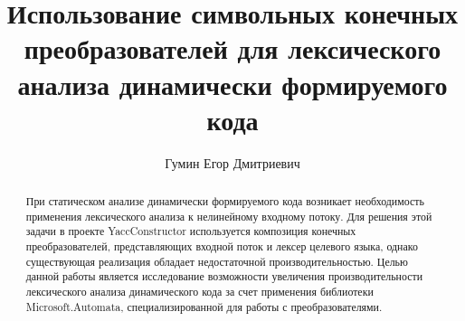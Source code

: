 \title{Использование символьных конечных преобразователей для лексического анализа динамически формируемого кода}


\author{Гумин Егор Дмитриевич}



\maketitle             

\begin{abstract}
При статическом анализе динамически формируемого кода возникает необходимость применения лексического анализа к нелинейному входному потоку.
Для решения этой задачи в проекте YaccConstructor используется композиция конечных преобразователей, 
представляющих входной поток и лексер целевого языка, 
однако существующая реализация обладает недостаточной производительностью. 
Целью данной работы является исследование возможности увеличения производительности лексического анализа динамического кода
 за счет применения библиотеки Microsoft.Automata, 
специализированной для работы с преобразователями.
\end{abstract}







